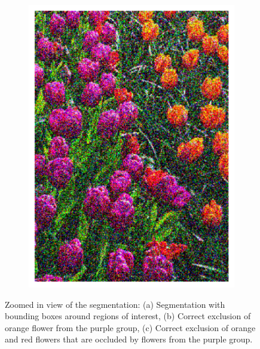 \documentclass[11pt]{article}
\begin{document}
\begin{figure}[H]
\begin{minipage}[c]{.35\textwidth}
\begin{subfigure}{\textwidth}
            \includegraphics[width=\linewidth]{figs/q1b_zoomed_region2.png}
            \caption{}  %
            \label{fig:q1b_zoomed_bad2}
        \end{subfigure}
    \end{minipage}
    \caption{Zoomed in view of the segmentation: (a) Segmentation with bounding boxes around regions of interest, (b) Correct exclusion of orange flower from the purple group, (c) Correct exclusion of orange and red flowers that are occluded by flowers from the purple group.}
    \label{fig:flowers_seg_zoomed}
\end{figure}
\end{document}
